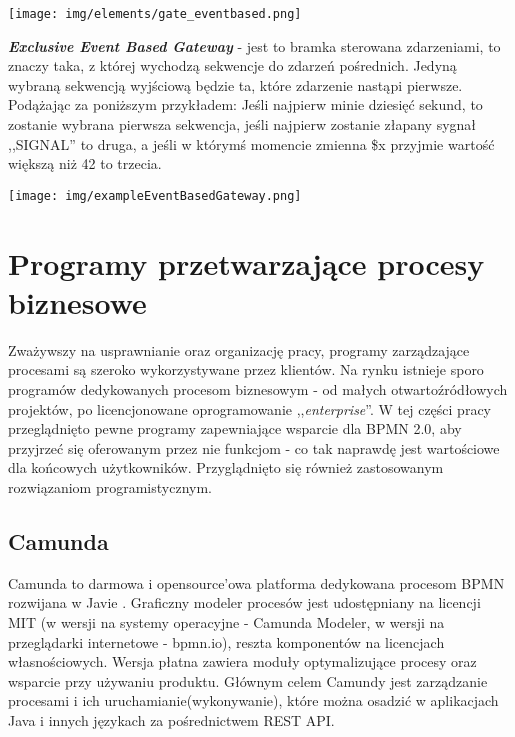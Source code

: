 \documentclass[declaration,shortabstract,mgr]{iithesis}
\newcommand{\bpmn}{BPMN }
\begin{document}
\vspace{\mypointsep}

\noindent\begin{minipage}[t]{0.075\textwidth}\vspace{0pt}
\texttt{[image: img/elements/gate\_eventbased.png]}
\end{minipage}\hfill
\begin{minipage}[t]{0.875\textwidth}\vspace{0pt}
\textbf{\textit{Exclusive Event Based Gateway}} - jest to bramka sterowana zdarzeniami, to znaczy taka, z której wychodzą sekwencje do zdarzeń pośrednich. Jedyną wybraną sekwencją wyjściową będzie ta, które zdarzenie nastąpi pierwsze. Podążając za poniższym przykładem: Jeśli najpierw minie dziesięć sekund, to zostanie wybrana pierwsza sekwencja, jeśli najpierw zostanie złapany sygnał ,,SIGNAL'' to druga, a jeśli w którymś momencie zmienna \$x przyjmie wartość większą niż 42 to trzecia.
\begin{center}
\texttt{[image: img/exampleEventBasedGateway.png]}
\end{center}
\end{minipage}

\vspace{\mypointsep}


\chapter{Programy przetwarzające procesy biznesowe}\label{chapter-programs}

Zważywszy na usprawnianie oraz organizację pracy, programy zarządzające procesami są szeroko wykorzystywane przez klientów. Na rynku istnieje sporo programów dedykowanych procesom biznesowym - od małych otwartoźródłowych projektów, po licencjonowane oprogramowanie ,,\textit{enterprise}''. W tej części pracy przeglądnięto pewne programy zapewniające wsparcie dla \bpmn 2.0, aby przyjrzeć się oferowanym przez nie funkcjom - co tak naprawdę jest wartościowe dla końcowych użytkowników. Przyglądnięto się również zastosowanym rozwiązaniom programistycznym.

\section{Camunda}
Camunda to  darmowa i opensource'owa platforma dedykowana procesom \bpmn rozwijana w Javie \cite{wiki-camunda}. Graficzny modeler procesów jest udostępniany na licencji MIT (w wersji na systemy operacyjne - Camunda Modeler, w wersji na przeglądarki internetowe - bpmn.io), reszta komponentów na licencjach własnościowych. Wersja płatna zawiera moduły optymalizujące procesy oraz wsparcie przy używaniu produktu. Głównym celem Camundy jest zarządzanie procesami i ich uruchamianie(wykonywanie), które można osadzić w aplikacjach Java i innych językach za pośrednictwem REST API.
\end{document}

